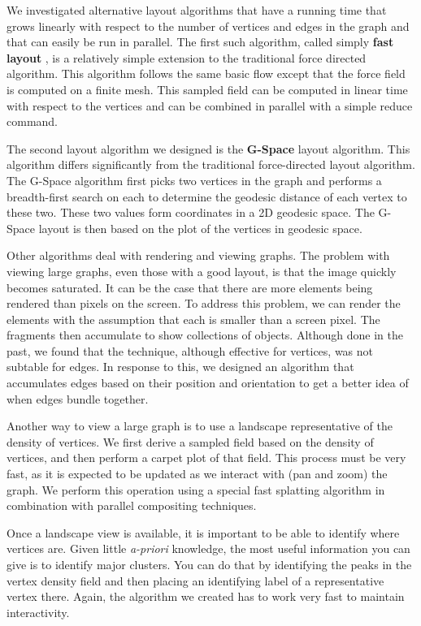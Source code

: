 \documentclass[pdf,12pt,report,strict]{SANDreport}
\newcommand*{\keyterm}[2][!*!]{%
  \textbf{#2}%
  \ifthenelse{\equal{#1}{!*!}}{\index{#2}}{\index{#1}}%
}
\begin{document}

We investigated alternative layout algorithms that have a running time that
grows linearly with respect to the number of vertices and edges in the
graph and that can easily be run in parallel.  The first such algorithm,
called simply \keyterm[fast~layout]{fast layout}, is a relatively
simple extension to the traditional force directed algorithm.  This
algorithm follows the same basic flow except that the force field is
computed on a finite mesh.  This sampled field can be computed in linear
time with respect to the vertices and can be combined in parallel with a
simple reduce command.


The second layout algorithm we designed is the
\keyterm{G-Space} layout algorithm.  This algorithm differs
significantly from the traditional force-directed layout algorithm.  The
G-Space algorithm first picks two vertices in the graph and performs a
breadth-first search on each to determine the geodesic distance of each
vertex to these two.  These two values form coordinates in a 2D geodesic
space.  The G-Space layout is then based on the plot of the vertices in
geodesic space.

Other algorithms deal with rendering and viewing graphs.  The problem with
viewing large graphs, even those with a good layout, is that the image
quickly becomes saturated.  It can be the case that there are more elements
being rendered than pixels on the screen.  To address this problem, we can
render the elements with the assumption that each is smaller than a screen
pixel.  The fragments then accumulate to show collections of objects.
Although done in the past, we found that the technique, although effective
for vertices, was not subtable for edges.  In response to this, we designed
an algorithm that accumulates edges based on their position and orientation
to get a better idea of when edges bundle together.

Another way to view a large graph is to use a landscape representative of
the density of vertices.  We first derive a sampled field based on the
density of vertices, and then perform a carpet plot of that field.  This
process must be very fast, as it is expected to be updated as we interact
with (pan and zoom) the graph.  We perform this operation using a special
fast splatting algorithm in combination with parallel compositing
techniques.

Once a landscape view is available, it is important to be able to identify
where vertices are.  Given little \emph{a-priori} knowledge, the most
useful information you can give is to identify major clusters.  You can do
that by identifying the peaks in the vertex density field and then placing
an identifying label of a representative vertex there.  Again, the
algorithm we created has to work very fast to maintain interactivity.
\end{document}
